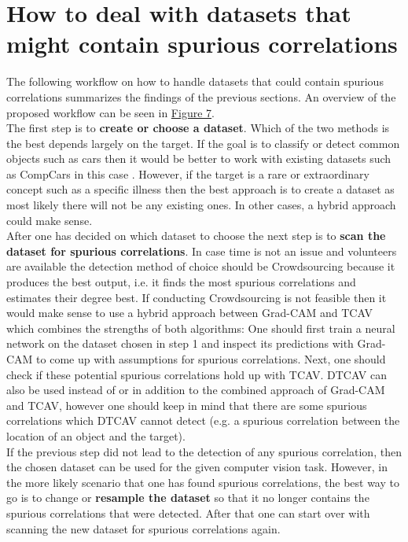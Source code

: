 \documentclass{article}
\begin{document}
\section{How to deal with datasets that might contain spurious correlations}
The following workflow on how to handle datasets that could contain spurious correlations summarizes the findings of the previous sections.
An overview of the proposed workflow can be seen in \hyperref[fig:workflow]{Figure 7}. \\
The first step is to \textbf{create or choose a dataset}. Which of the two methods is the best depends largely on the target. If the goal is to classify or
detect common objects such as cars then it would be better to work with existing datasets such as CompCars in this case \cite{Yang_2015_CVPR}.
However, if the target is a rare or extraordinary concept such as a specific illness then the best approach is to create a dataset as most likely there will
not be any existing ones. In other cases, a hybrid approach could make sense. \\
After one has decided on which dataset to choose the next step is to \textbf{scan the dataset for spurious correlations}. In case time is not an issue
and volunteers are available the detection method of choice should be Crowdsourcing because it produces the best output, i.e. it finds the most spurious
correlations and estimates their degree best. If conducting Crowdsourcing is not feasible then it would make sense to use a hybrid approach between Grad-CAM and TCAV which
combines the strengths of both algorithms: One should first train a neural network on the dataset chosen in step 1 and inspect its predictions with Grad-CAM
to come up with assumptions for spurious correlations. Next, one should check if these potential spurious correlations hold up with TCAV. DTCAV can also be used 
instead of or in addition to the combined approach of Grad-CAM and TCAV, however one should keep in mind that there are some spurious correlations which DTCAV cannot detect
(e.g. a spurious correlation between the location of an object and the target). \\
If the previous step did not lead to the detection of any spurious correlation, then the chosen dataset can be used for the given computer vision task. 
However, in the more likely scenario that one has found spurious correlations, the best way to go is to change or \textbf{resample the dataset} so that it no longer
contains the spurious correlations that were detected. After that one can start over with scanning the new dataset for spurious correlations again. \\
\end{document}
